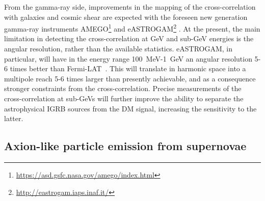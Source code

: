 

From the gamma-ray side, improvements in the mapping of the cross-correlation with galaxies and cosmic shear are 
expected with the foreseen new generation gamma-ray instruments AMEGO\footnote{\url{https://asd.gsfc.nasa.gov/amego/index.html}} and eASTROGAM\footnote{\url{http://eastrogam.iaps.inaf.it/}} \citep{1711.01265}.
At the present, the main limitation in detecting the cross-correlation at GeV and sub-GeV energies is the angular
resolution, rather than the available statistics.  eASTROGAM, in particular, will have in the energy range \mbox{100 MeV-1 GeV}
an angular resolution 5-6 times better than Fermi-LAT~\citep{1711.01265}. This will translate in harmonic space into a multipole reach 5-6 times larger than presently achievable, and as a consequence stronger constraints from the cross-correlation.
Precise measurements of the cross-correlation at sub-GeVs will further improve the ability to separate the astrophysical IGRB sources from the DM signal, increasing the sensitivity to the latter. 













\subsection{Axion-like particle emission from supernovae }

